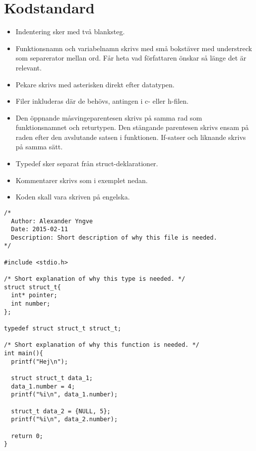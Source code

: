 \section{Kodstandard}


\begin{itemize}
  \item Indentering sker med två blanksteg.
  \item Funktionsnamn och variabelnamn skrivs med små bokstäver med understreck som separerator mellan ord. Får heta vad författaren önskar så länge det är relevant. 
  \item Pekare skrivs med asterisken direkt efter datatypen.
  \item Filer inkluderas där de behövs, antingen i c- eller h-filen.
  \item Den öppnande måsvingeparentesen skrivs på samma rad som funktionsnamnet och returtypen. Den stängande parentesen skrivs ensam på raden efter den avslutande satsen i funktionen. If-satser och liknande skrivs på samma sätt.
  \item Typedef sker separat från struct-deklarationer.
  \item Kommentarer skrivs som i exemplet nedan.
  \item Koden skall vara skriven på engelska.
\end{itemize}

\begin{lstlisting}
/*
  Author: Alexander Yngve
  Date: 2015-02-11
  Description: Short description of why this file is needed.
*/

#include <stdio.h>

/* Short explanation of why this type is needed. */
struct struct_t{
  int* pointer;
  int number;
};

typedef struct struct_t struct_t;

/* Short explanation of why this function is needed. */
int main(){
  printf("Hej\n");

  struct struct_t data_1;
  data_1.number = 4;
  printf("%i\n", data_1.number);

  struct_t data_2 = {NULL, 5};
  printf("%i\n", data_2.number);

  return 0;
}
\end{lstlisting}

